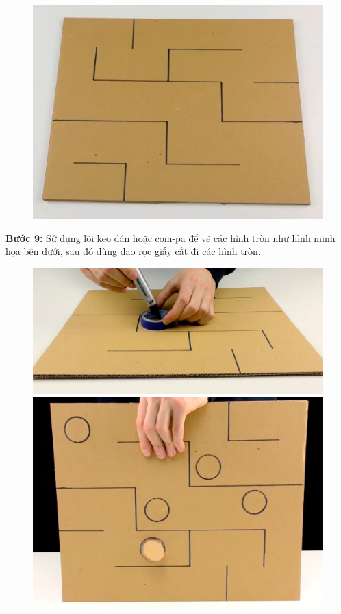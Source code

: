 \begin{multicols}{2}
\begin{figure}[H]
		\includegraphics[width= 0.9\linewidth]{13}
		\vspace*{-10pt}
	\end{figure}
	\textbf{\color{toancuabi}Bước $\pmb{9}$:} Sử dụng lõi keo dán hoặc com-pa để vẽ các hình tròn như hình minh họa bên dưới, sau đó dùng dao rọc giấy cắt đi các hình tròn.
	\begin{figure}[H]
		\vspace*{-5pt}
		\centering
		\captionsetup{labelformat= empty, justification=centering}
		\includegraphics[width= 0.9\linewidth]{14}
		\includegraphics[width= 0.9\linewidth]{15}

\end{figure}
\end{multicols}
